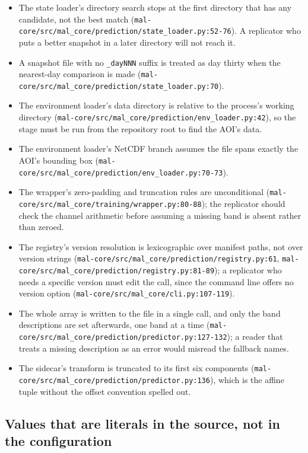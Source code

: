 \documentclass[11pt,a4paper]{article}
\newcommand{\code}[1]{\texttt{#1}}
\begin{document}
\begin{itemize}
\item The state loader's directory search stops at the first directory that
  has any candidate, not the best match
  (\code{mal-core/src/mal\_core/prediction/state\_loader.py:52-76}). A
  replicator who puts a better snapshot in a later directory will not reach
  it.
\item A snapshot file with no \code{\_dayNNN} suffix is treated as day
  thirty when the nearest-day comparison is made
  (\code{mal-core/src/mal\_core/prediction/state\_loader.py:70}).
\item The environment loader's data directory is relative to the process's
  working directory (\code{mal-core/src/mal\_core/prediction/env\_loader.py:42}),
  so the stage must be run from the repository root to find the AOI's data.
\item The environment loader's NetCDF branch assumes the file spans exactly
  the AOI's bounding box (\code{mal-core/src/mal\_core/prediction/env\_loader.py:70-73}).
\item The wrapper's zero-padding and truncation rules are unconditional
  (\code{mal-core/src/mal\_core/training/wrapper.py:80-88}); the replicator
  should check the channel arithmetic before assuming a missing band is
  absent rather than zeroed.
\item The registry's version resolution is lexicographic over manifest paths,
  not over version strings
  (\code{mal-core/src/mal\_core/prediction/registry.py:61},
  \code{mal-core/src/mal\_core/prediction/registry.py:81-89}); a replicator
  who needs a specific version must edit the call, since the command line
  offers no version option (\code{mal-core/src/mal\_core/cli.py:107-119}).
\item The whole array is written to the file in a single call, and only the
  band descriptions are set afterwards, one band at a time
  (\code{mal-core/src/mal\_core/prediction/predictor.py:127-132}); a reader
  that treats a missing description as an error would misread the
  fallback names.
\item The sidecar's transform is truncated to its first six components
  (\code{mal-core/src/mal\_core/prediction/predictor.py:136}), which is the
  affine tuple without the offset convention spelled out.
\end{itemize}

\subsection{Values that are literals in the source, not in the configuration}
\end{document}
